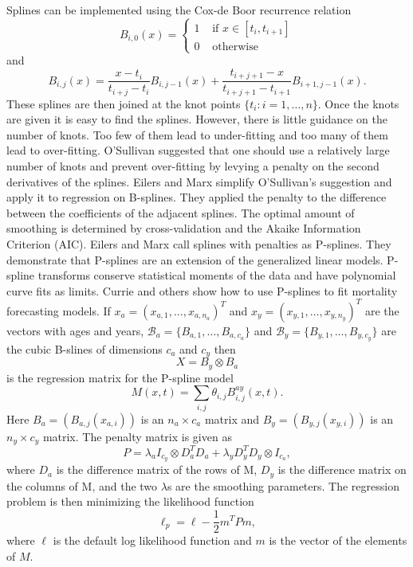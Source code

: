 \documentclass{article}
\numberwithin{equation}{section}
\begin{document}
Splines can be implemented using the Cox-de Boor recurrence relation
\cite{de1978practical}
\begin{equation}\label{s13e1}
B_{i,0}(x) = \begin{cases}
1 & \text{ if } x \in [t_i, t_{i+1}] \\
0 & \text{ otherwise}
\end{cases}
\end{equation}
and
\begin{equation}\label{s13e2}
B_{i,j}(x) = \frac{x - t_i}{t_{i+j} - t_i}B_{i,j-1}(x) + 
\frac{t_{i+j+1}-x}{t_{i+j+1}-t_{i+1}}B_{i+1,j-1}(x).
\end{equation}
These splines are then joined at the knot points $\{t_i: i = 1, \ldots, n\}$.
Once the knots are given it is easy to find the splines. However, there is
little guidance on the number of knots. Too few of them lead to under-fitting
and too many of them lead to over-fitting. O'Sullivan \cite{o1986statistical}
suggested that one should use a relatively large number of knots and prevent
over-fitting by levying a penalty on the second derivatives of the splines.
Eilers and Marx \cite{eilers1996flexible} simplify O'Sullivan's suggestion
and apply it to regression on B-splines. They applied the penalty to the
difference between the coefficients of the adjacent splines. The optimal amount
of smoothing is determined by cross-validation and the Akaike Information 
Criterion (AIC). Eilers and Marx call splines with penalties as P-splines.
They demonstrate that P-splines are an extension of the generalized linear
models. P-spline transforms conserve statistical moments of the data and have
polynomial curve fits as limits. Currie and others \cite{currie2004smoothing}
show how to use P-splines to fit mortality forecasting models. If $x_a = (
x_{a,1},\ldots,x_{a,n_a})^T$ and $x_y=(x_{y,1},\ldots,x_{y,n_y})^T$ are the
vectors with ages and years, $\mathcal{B}_a = \{B_{a,1}, \ldots, B_{a, c_a}\}$
and $\mathcal{B}_y = \{B_{y,1},\ldots,B_{y, c_y}\}$ are the cubic B-slines of
dimensions $c_a$ and $c_y$ then
\begin{equation}\label{c14e1}
X = B_y \otimes B_a
\end{equation}
is the regression matrix for the P-spline model
\begin{equation}\label{c14e2}
M(x,t) = \sum_{i,j}\theta_{i,j}B_{i,j}^{ay}(x, t).
\end{equation}
Here $B_a =(B_{a,j}(x_{a,i}))$ is an $n_a \times c_a$ matrix and $B_y = 
(B_{y,j}(x_{y,i}))$ is an $n_y \times c_y$ matrix. The penalty matrix is given
as
\begin{equation}\label{c14e3}
P = \lambda_aI_{c_y} \otimes D_a^TD_a + \lambda_y D_y^TD_y\otimes I_{c_a},
\end{equation}
where $D_a$ is the difference matrix of the rows of M, $D_y$ is the difference
matrix on the columns of M, and the two $\lambda$s are the smoothing parameters.
The regression problem is then minimizing the likelihood function
\begin{equation}\label{c14e4}
\ell_p = \ell - \frac{1}{2} m^TPm,
\end{equation}
where $\ell$ is the default log likelihood function and $m$ is the vector of
the elements of $M$.
\end{document}
